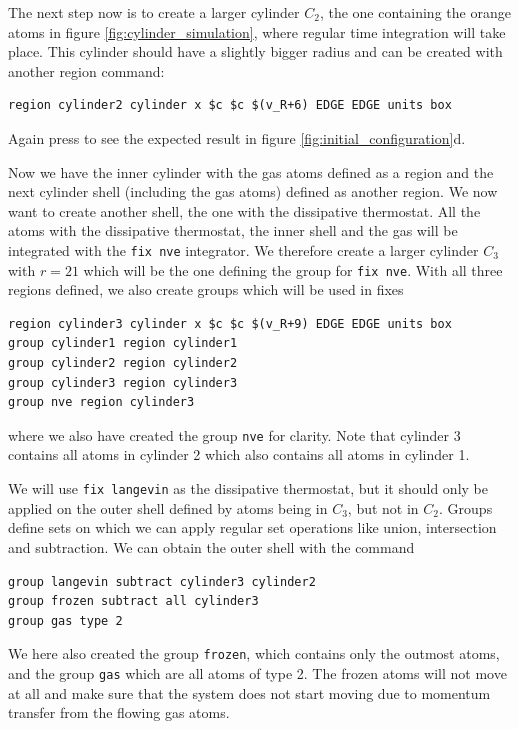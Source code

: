 \documentclass[12pt,a4paper,final]{iopart}
\newcommand{\code}[1]{\colorbox{light-gray}{\color{RawSienna}\texttt{#1}}}
\begin{document}
The next step now is to create a larger cylinder $C_2$, the one containing the orange atoms in
figure \ref{fig:cylinder_simulation}, where regular time integration will take place.
This cylinder should have a slightly bigger radius and can be created with another region command:
\begin{lstlisting}
region cylinder2 cylinder x $c $c $(v_R+6) EDGE EDGE units box
\end{lstlisting}
Again press  to see the expected result in figure \ref{fig:initial_configuration}d.

Now we have the inner cylinder with the gas atoms defined as a region and the next cylinder shell (including the gas atoms) defined as another region.
We now want to create another shell, the one with the dissipative thermostat.
All the atoms with the dissipative thermostat, the inner shell and the gas will be integrated with the \code{fix nve} integrator.
We therefore create a larger cylinder $C_3$ with $r=21$ which will be the one defining the group for \code{fix nve}.
With all three regions defined, we also create groups which will be used in fixes
\begin{lstlisting}
region cylinder3 cylinder x $c $c $(v_R+9) EDGE EDGE units box
group cylinder1 region cylinder1
group cylinder2 region cylinder2
group cylinder3 region cylinder3
group nve region cylinder3
\end{lstlisting}
where we also have created the group \code{nve} for clarity.
Note that cylinder 3 contains all atoms in cylinder 2 which also contains all atoms in cylinder 1.

We will use \code{fix langevin}\cite{schneider1978molecular} as the dissipative thermostat,
but it should only be applied on the outer shell defined by atoms being in $C_3$, but not in $C_2$.
Groups define sets on which we can apply regular set operations like union, intersection and subtraction.
We can obtain the outer shell with the command

\begin{lstlisting}
group langevin subtract cylinder3 cylinder2
group frozen subtract all cylinder3
group gas type 2
\end{lstlisting}

We here also created the group \code{frozen}, which contains only the outmost atoms,
and the group \code{gas} which are all atoms of type 2.
The frozen atoms will not move at all and make sure that the system does not start 
moving due to momentum transfer from the flowing gas atoms.
\end{document}
